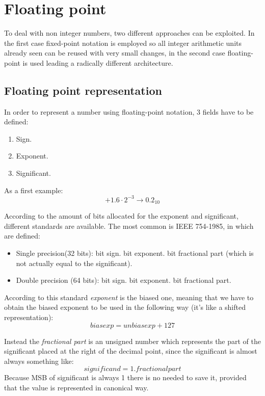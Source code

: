 \chapter{Floating point}
To deal with non integer numbers, two different approaches can be exploited. In
the first case fixed-point notation is employed so all integer arithmetic units
already seen can be reused with very small changes, in the second case
floating-point is used leading a radically different architecture.

\section{Floating point representation}
In order to represent a number using floating-point notation, 3 fields have to be defined:
\begin{enumerate}
  \item Sign.
  \item Exponent.
  \item Significant.
\end{enumerate}
As a first example:
$$+1.6 \cdot 2^{-3} \rightarrow 0.2_{10}$$

According to the amount of bits allocated for the exponent and significant,
different standards are available. The most common is IEEE 754-1985, in which
are defined:
\begin{itemize}
  \item Single precision(32 bits):
     bit sign.
     bit exponent.
     bit fractional part (which is not actually equal to the significant).

  \item Double precision (64 bits):
     bit sign.
     bit exponent.
     bit fractional part.
\end{itemize}

According to this standard \textit{exponent} is the biased one, meaning that we
have to obtain the biased exponent to be used in the following way (it's like a
shifted representation):
$$bias exp= unbias exp + 127 $$

Instead the \textit{fractional part} is an unsigned number which represents the
part of the significant placed at the right of the decimal point, since the
significant is almost always something like:
$$significand=1.fractional part$$
Because MSB of significant is always 1 there is no needed to save it, provided
that the value is represented in canonical way.

